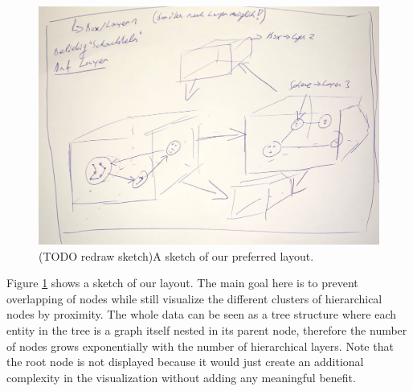 \begin{figure}[h]
    \centering
    \includegraphics[width=1\textwidth]{chapters/graphics/concept1.jpg}
    \caption{(TODO redraw sketch)A sketch of our preferred layout. } 
    \label{fig:layoutSketch} 
\end{figure}

Figure \ref{fig:layoutSketch} shows a sketch of our layout. The main goal here is to prevent overlapping of nodes while still visualize the different clusters of hierarchical nodes by proximity. The whole data can be seen as a tree structure where each entity in the tree is a graph itself nested in its parent node, therefore the number of nodes grows exponentially with the number of hierarchical layers. Note that the root node is not displayed because it would just create an additional complexity in the visualization without adding any meaningful benefit.
